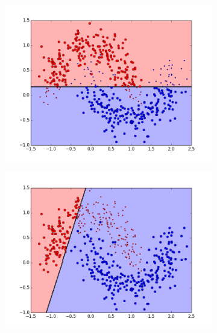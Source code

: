 \begin{figure}[t!]
\medskip
\begin{subfigure}{0.48\textwidth}
\includegraphics[width=\linewidth]{figs/Banana/22All-Classifiers}
\caption{} \label{fig:Banana_all_single_c}
\end{subfigure}\hspace*{\fill}
\begin{subfigure}{0.48\textwidth}
\includegraphics[width=\linewidth]{figs/Banana/54All-Classifiers}
\caption{} \label{fig:Banana_all_single_d}
\end{subfigure}


\end{figure}
